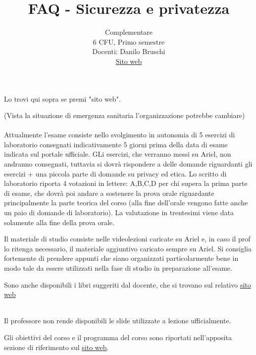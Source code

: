 \documentclass{article}
\title{FAQ - \textbf{Sicurezza e privatezza}}
\author{
	Complementare\\6 CFU, Primo semestre\\
	Docenti: Danilo Bruschi\\ 
	\href{https://dbruschisp.ariel.ctu.unimi.it/v5/home/Default.aspx}{Sito web}
	\date{}
}
\begin{document}
 
	\maketitle
	
	\begin{QuestionList}
		
		 {
		    Lo trovi qui sopra se premi "sito web".
		}
		
		
		 {
		    (Vista la situazione di emergenza sanitaria l'organizzazione potrebbe cambiare)\\\\
		    Attualmente l'esame consiste nello svolgimento in autonomia di 5 esercizi di laboratorio consegnati indicativamente 5 giorni prima della data di esame indicata sul portale ufficiale. GLi esercizi, che verranno messi su Ariel, non andranno consegnati, tuttavia si dovrà rispondere a delle domande riguardanti gli esercizi + una piccola parte di domande su privacy ed etica. Lo scritto di laboratorio riporta 4 votazioni in lettere: A,B,C,D per chi supera la prima parte di esame, che dovrà poi andare a sostenere la prova orale riguardante principalmente la parte teorica del corso (alla fine dell'orale vengono fatte anche un paio di domande di laboratorio). La valutazione in trentesimi viene data solamente alla fine della prova orale. 
		}
		
		 {
		    Il materiale di studio consiste nelle videolezioni caricate su Ariel e, in caso il prof lo ritenga necessario, il materiale aggiuntivo caricato sempre su Ariel. Si consiglia fortemente di prendere appunti che siano organizzati particolarmente bene in modo tale da essere utilizzati nella fase di studio in preparazione all'esame.
		    
		    Sono anche disponibili i libri suggeriti dal docente, che si trovano sul relativo \href{https://dbruschisp.ariel.ctu.unimi.it/v5/home/Default.aspx}{sito web}
		}
		\\
		 {
		    Il professore non rende disponibili le slide utilizzate a lezione ufficialmente.
		}
		
		 {
		    Gli obiettivi del corso e il programma del corso sono riportati nell'apposita sezione di riferimento sul \href{https://dbruschisp.ariel.ctu.unimi.it/v5/frm3/ThreadList.aspx?fc=JLsIzLlTf\%2f2BRiwqHvu8qUL7Tca3z8awbM93tg8KSad1OKWxnxac8S63yZFVQBL7&roomid=160439}{sito web}.
		}
		
	\end{QuestionList}
	
\end{document}
